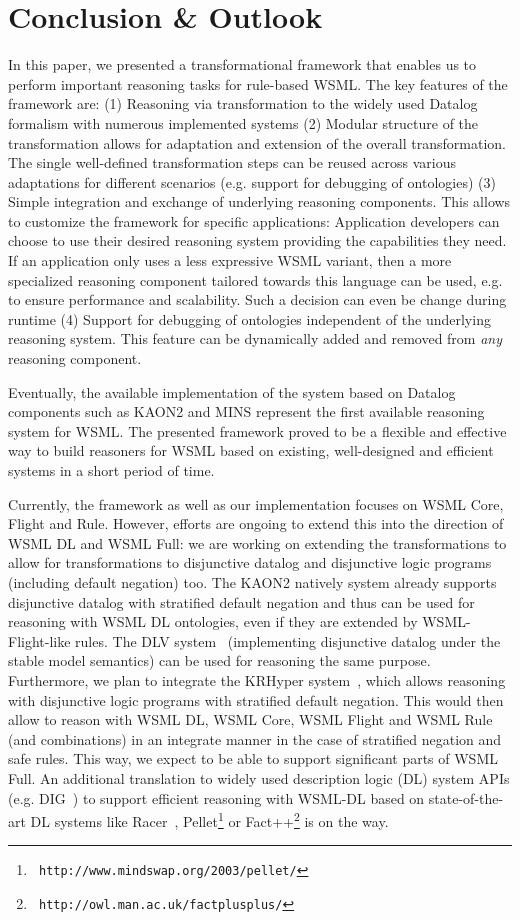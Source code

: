 \section{Conclusion \& Outlook\label{sec:outlook}}
In this paper, we presented a transformational framework that
enables us to perform important reasoning tasks for rule-based
WSML. The key features of the framework are: (1) Reasoning via
transformation to the widely used Datalog formalism with numerous
implemented systems (2) Modular structure of the transformation
allows for adaptation and extension of the overall transformation.
The single well-defined transformation steps can be reused across
various adaptations for different scenarios (e.g. support for
debugging of ontologies) (3) Simple integration and exchange of
underlying reasoning components. This allows to customize the
framework for specific applications: Application developers can
choose to use their desired reasoning system providing the
capabilities they need. If an application only uses a less
expressive WSML variant, then a more specialized reasoning
component tailored towards this language can be used, e.g. to
ensure performance and scalability. Such a decision can even be
change during runtime (4) Support for debugging of ontologies
independent of the underlying reasoning system. This feature can
be dynamically added and removed from \emph{any} reasoning
component.

 Eventually, the available implementation of the
system based on Datalog components such as KAON2 and MINS
represent the first available reasoning system for WSML. The
presented framework proved to be a flexible and effective way to
build reasoners for WSML based on existing, well-designed and
efficient systems in a short period of time.

Currently, the framework as well as our implementation focuses on
WSML Core, Flight and Rule. However, efforts are ongoing to extend
this into the direction of WSML DL and WSML Full: we are working
on extending the transformations to allow for transformations to
disjunctive datalog and disjunctive logic programs (including
default negation) too. The KAON2 natively system already supports
disjunctive datalog with stratified default negation and thus can
be used for reasoning with WSML DL ontologies, even if they are
extended by WSML-Flight-like rules. The DLV
system~\cite{citrigno97dlv} (implementing disjunctive datalog
under the stable model semantics) can be used for reasoning the
same purpose. Furthermore, we plan to integrate the KRHyper
system~\cite{wernhard03system}, which allows reasoning with
disjunctive logic programs with stratified default negation. This
would then allow to reason with WSML DL, WSML Core, WSML Flight
and WSML Rule (and combinations) in an integrate manner in the
case of stratified negation and safe rules. This way, we expect to
be able to support significant parts of WSML Full. An additional
translation to widely used description logic (DL) system APIs
(e.g. DIG~\cite{BechhoferMC03}) to support efficient reasoning
with WSML-DL based on state-of-the-art DL systems like
Racer~\cite{haarslev01racer}, Pellet\footnote{\tt
http://www.mindswap.org/2003/pellet/} or Fact++\footnote{\tt
http://owl.man.ac.uk/factplusplus/} is on the way.

